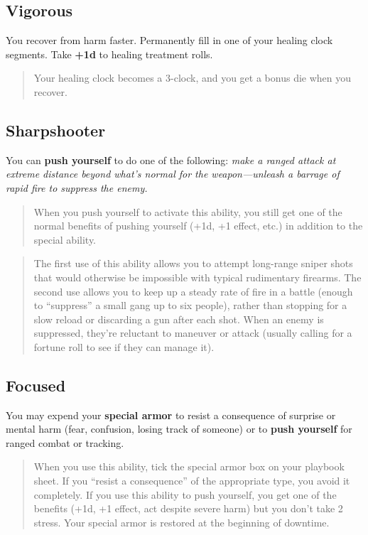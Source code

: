 \documentclass[11pt,oneside]{book}
\begin{document}
\subsection{Vigorous}

You recover from harm faster. Permanently fill in one of your healing clock segments. Take \textbf{+1d} to healing treatment rolls.

\begin{quote}
	Your healing clock becomes a 3-clock, and you get a bonus die when you recover.
\end{quote} 

\subsection{Sharpshooter}

You can \textbf{push yourself} to do one of the following: \emph{make a ranged attack at extreme distance beyond what’s normal for the weapon---unleash a barrage of rapid fire to suppress the enemy.}

\begin{quote}
	When you push yourself to activate this ability, you still get one of the normal benefits of pushing yourself (+1d, +1 effect, etc.) in addition to the special ability.
\end{quote} 

\begin{quote}
	The first use of this ability allows you to attempt long-range sniper shots that would otherwise be impossible with  typical rudimentary firearms. The second use allows you to keep up a steady rate of fire in a battle (enough to “suppress” a small gang up to six people), rather than stopping for a slow reload or discarding a gun after each shot. When an enemy is suppressed, they’re reluctant to maneuver or attack (usually calling for a fortune roll to see if they can manage it).
\end{quote} 

\subsection{Focused}

You may expend your \textbf{special armor} to resist a consequence of surprise or mental harm (fear, confusion, losing track of someone) or to \textbf{push yourself} for ranged combat or tracking.

\begin{quote}
	When you use this ability, tick the special armor box on your playbook sheet. If you “resist a consequence” of the appropriate type, you avoid it completely. If you use this ability to push yourself, you get one of the benefits (+1d, +1 effect, act despite severe harm) but you don’t take 2 stress. Your special armor is restored at the beginning of downtime.
\end{quote} 
\end{document}
